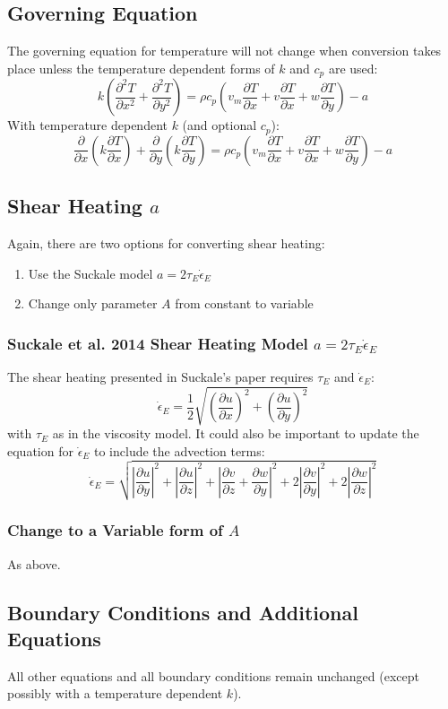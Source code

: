 \documentclass[10pt, letterpaper, twoside]{article}
\newcommand{\pd}[2]{\frac{\partial#1}{\partial#2}}
\begin{document}
	\subsection{Governing Equation}
	The governing equation for temperature will not change when conversion takes place unless the temperature dependent forms of $ k $ and $ c_p $ are used:
	\begin{equation*}
		k\left(\pd{^2T}{x^2} + \pd{^2T}{y^2}\right) = \rho c_p\left(v_m\pd{T}{x}+v\pd{T}{x}+w\pd{T}{y}\right) - a
	\end{equation*}
	With temperature dependent $ k $ (and optional $ c_p $):
	\begin{equation*}
		\pd{}{x}\left(k\pd{T}{x}\right) + \pd{}{y}\left(k\pd{T}{y}\right) = \rho c_p\left(v_m\pd{T}{x}+v\pd{T}{x}+w\pd{T}{y}\right) - a
	\end{equation*}
	\subsection{Shear Heating $ a $}
	Again, there are two options for converting shear heating:
	\begin{enumerate}
		\item Use the Suckale model $ a = 2\tau_{\scriptscriptstyle E}\dot{\epsilon}_{\scriptscriptstyle E} $
		\item Change only parameter $ A $ from constant to variable
	\end{enumerate}
	\subsubsection{Suckale et al. 2014 Shear Heating Model $ a = 2\tau_{\scriptscriptstyle E}\dot{\epsilon}_{\scriptscriptstyle E} $}
	The shear heating presented in Suckale's paper requires $ \tau_{\scriptscriptstyle E} $ and $ \dot{\epsilon}_{\scriptscriptstyle E} $:
	\begin{equation}
		\dot{\epsilon}_{\scriptscriptstyle E} =\frac{1}{2}\sqrt{\left(\pd{u}{x}\right)^2 + \left(\pd{u}{y}\right)^2}
	\end{equation}
	with $ \tau_{\scriptscriptstyle E} $ as in the viscosity model.
	It could also be important to update the equation for $ \dot{\epsilon}_{\scriptscriptstyle E} $ to include the advection terms:
	\begin{equation*}
		\dot{\epsilon}_{\scriptscriptstyle E} = \sqrt{\left|\pd{u}{y}\right|^2 + \left|\pd{u}{z}\right|^2 + \left|\pd{v}{z} + \pd{w}{y}\right|^2 + 2\left|\pd{v}{y}\right|^2 + 2\left|\pd{w}{z}\right|^2}
	\end{equation*}
	\subsubsection{Change to a Variable form of $ A $}
	As above.
	\subsection{Boundary Conditions and Additional Equations}
	All other equations and all boundary conditions remain unchanged (except possibly with a temperature dependent $ k $).
	
\end{document}
